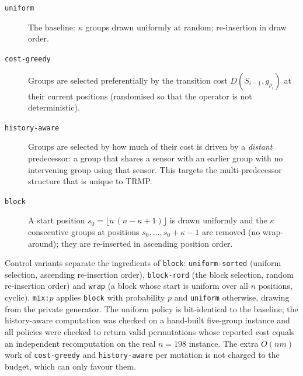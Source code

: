 \begin{description}
\item[\texttt{uniform}] The baseline: $\kappa$ groups drawn uniformly at random; re-insertion in draw order.
\item[\texttt{cost-greedy}] Groups are selected preferentially by the transition cost $D(S_{i-1},g_{\rho_i})$ at their current positions (randomised so that the operator is not deterministic).
\item[\texttt{history-aware}] Groups are selected by how much of their cost is driven by a \emph{distant} predecessor: a group that shares a sensor with an earlier group with no intervening group using that sensor. This targets the multi-predecessor structure that is unique to TRMP.
\item[\texttt{block}] A start position $s_0=\lfloor u\,(n-\kappa+1)\rfloor$ is drawn uniformly and the $\kappa$ consecutive groups at positions $s_0,\ldots,s_0+\kappa-1$ are removed (no wrap-around); they are re-inserted in ascending position order.
\end{description}

\noindent Control variants separate the ingredients of \texttt{block}: \texttt{uniform-sorted} (uniform selection, ascending re-insertion order), \texttt{block-rord} (the block selection, random re-insertion order) and \texttt{wrap} (a block whose start is uniform over all $n$ positions, cyclic). \texttt{mix:}$p$ applies \texttt{block} with probability $p$ and \texttt{uniform} otherwise, drawing from the private generator. The uniform policy is bit-identical to the baseline; the history-aware computation was checked on a hand-built five-group instance and all policies were checked to return valid permutations whose reported cost equals an independent recomputation on the real $n=198$ instance. The extra $O(nm)$ work of \texttt{cost-greedy} and \texttt{history-aware} per mutation is not charged to the budget, which can only favour them.
